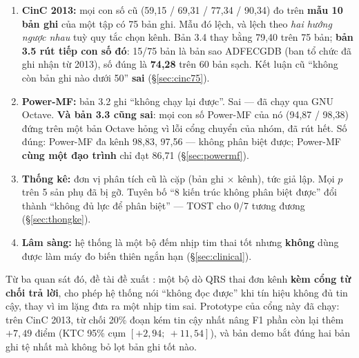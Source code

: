 \begin{canhbao}[title={Bản 3.3 sửa gì so với bản 3.2 --- đọc trước khi đọc phần còn lại}]
\footnotesize
\begin{enumerate}[leftmargin=1.5em,itemsep=2pt]
\item \textbf{CinC 2013:} mọi con số cũ (59,15 / 69,31 / 77,34 / 90,34) đo trên \textbf{mẫu 10 bản ghi}
của một tập có 75 bản ghi. Mẫu đó lệch, và lệch theo \textit{hai hướng ngược nhau} tuỳ quy tắc chọn kênh.
Bản 3.4 thay bằng 79,40 trên 75 bản; \textbf{bản 3.5 rút tiếp con số đó}: 15/75 bản là bản sao ADFECGDB (ban
tổ chức đã ghi nhận từ 2013), số đúng là \textbf{74,28} trên 60 bản sạch. Kết luận cũ ``không còn bản ghi
nào dưới 50'' \textbf{sai} (\S\ref{sec:cinc75}).
\item \textbf{Power-MF:} bản 3.2 ghi ``không chạy lại được''. Sai --- đã chạy qua GNU Octave.
\textbf{Và bản 3.3 cũng sai}: mọi con số Power-MF của nó (94,87 / 98,38) đứng trên một bản Octave hỏng vì
lỗi cổng chuyển của nhóm, đã rút hết. Số đúng: Power-MF đa kênh 98,83, \hethong{} 97,56 --- không phân
biệt được; Power-MF \textbf{cùng một đạo trình} chỉ đạt 86,71 (\S\ref{sec:powermf}).
\item \textbf{Thống kê:} đơn vị phân tích cũ là cặp (bản ghi $\times$ kênh), tức giả lập. Mọi $p$ trên
5 sản phụ đã bị gỡ. Tuyên bố ``8 kiến trúc không phân biệt được'' đổi thành ``không đủ lực để phân biệt''
--- TOST cho 0/7 tương đương (\S\ref{sec:thongke}).
\item \textbf{Lâm sàng:} hệ thống là một bộ đếm nhịp tim thai tốt nhưng \textbf{không} dùng được làm máy
đo biến thiên ngắn hạn (\S\ref{sec:clinical}).
\end{enumerate}
\end{canhbao}

Từ ba quan sát đó, đề tài đề xuất \hethong{}: một bộ dò QRS thai đơn kênh \textbf{kèm cổng từ chối trả
lời}, cho phép hệ thống nói ``không đọc được'' khi tín hiệu không đủ tin cậy, thay vì im lặng đưa ra một
nhịp tim sai. Prototype của cổng này đã chạy: trên CinC 2013, từ chối 20\% đoạn kém tin cậy nhất nâng
F1 phần còn lại thêm $+7{,}49$ điểm (KTC 95\% cụm $[+2{,}94;\ +11{,}54]$), và bản demo bắt đúng hai bản
ghi tệ nhất mà không bỏ lọt bản ghi tốt nào.

